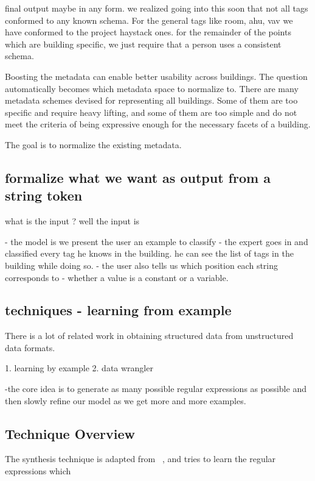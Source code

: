 final output maybe in any form. 
we realized going into this soon that not all tags conformed to any known schema. 
For the general tags like room, ahu, vav we have conformed to the project haystack ones. 
for the remainder of the points which are building specific, we just require that a person uses a consistent schema. 


Boosting the metadata can enable better usability across buildings. The question automatically becomes which metadata space to normalize to. There are many metadata schemes devised for representing all buildings. Some of them are too specific and require heavy lifting, and some of them are too simple and do not meet the criteria of being expressive enough for the necessary facets of a building. 


The goal is to normalize the existing metadata. 

\subsection{ formalize what we want as output from a string token}

what is the input ? 
well the input is 



- the model is we present the user an example to classify
- the expert goes in and classified every tag he knows in the building. he can see the list of tags in the building while doing so. 
- the user also tells us which position each string corresponds to 
- whether a value is a constant or a variable.

\subsection{techniques - learning from example}

There is a lot of related work in obtaining structured data from unstructured data formats. 

1. learning by example
2. data wrangler

-the core idea is to generate as many possible regular expressions as possible and then slowly refine our model as we get more and more examples.



\subsection{Technique Overview}

The synthesis technique is adapted from ~\cite{gulwani}, and tries to learn the regular expressions which 

